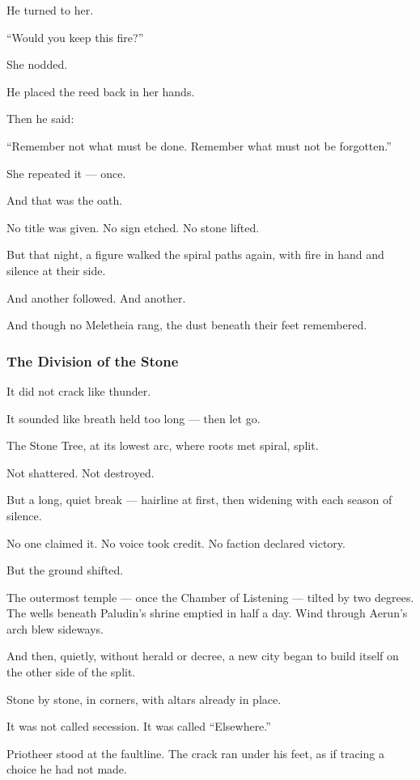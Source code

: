 \documentclass[12pt]{article}
\begin{document}
He turned to her.

 “Would you keep this fire?”

She nodded.

He placed the reed back in her hands.

Then he said:

 “Remember not what must be done.  
 Remember what must not be forgotten.”

She repeated it — once.

And that was the oath.

No title was given.  
No sign etched.  
No stone lifted.

But that night, a figure walked the spiral paths again,  
with fire in hand  
and silence at their side.

And another followed.  
And another.

And though no Meletheia rang,  
the dust beneath their feet remembered.

\dotfill

\subsubsection{The Division of the Stone}


It did not crack like thunder.

It sounded like breath held too long —  
then let go.

The Stone Tree, at its lowest arc,  
where roots met spiral,  
split.

Not shattered. Not destroyed.

But a long, quiet break —  
hairline at first,  
then widening with each season of silence.

No one claimed it.  
No voice took credit.  
No faction declared victory.

But the ground shifted.

The outermost temple — once the Chamber of Listening — tilted by two degrees.  
The wells beneath Paludin’s shrine emptied in half a day.  
Wind through Aerun’s arch blew sideways.

And then, quietly, without herald or decree,  
a new city began to build itself on the other side of the split.

Stone by stone,  
in corners,  
with altars already in place.

It was not called secession.  
It was called “Elsewhere.”

Priotheer stood at the faultline.  
The crack ran under his feet,  
as if tracing a choice he had not made.
\end{document}
